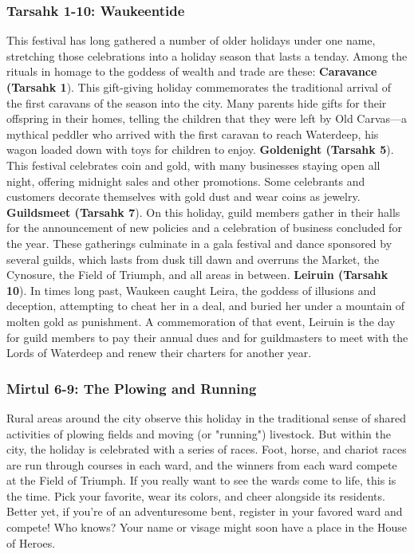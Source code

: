 \documentclass[10pt,a4paper,twoside,twocolumn,openany,nodeprecatedcode]{dndbook}
\begin{document}
\subsubsection{Tarsahk 1-10: Waukeentide}
This festival has long gathered a number of older holidays under one name, stretching those celebrations into a holiday season that lasts a tenday. Among the rituals in homage to the goddess of wealth and trade are these: \textbf{Caravance (Tarsahk 1}). This gift-giving holiday commemorates the traditional arrival of the first caravans of the season into the city. Many parents hide gifts for their offspring in their homes, telling the children that they were left by Old Carvas—a mythical peddler who arrived with the first caravan to reach Waterdeep, his wagon loaded down with toys for children to enjoy. \textbf{Goldenight (Tarsahk 5}). This festival celebrates coin and gold, with many businesses staying open all night, offering midnight sales and other promotions. Some celebrants and customers decorate themselves with gold dust and wear coins as jewelry. \textbf{Guildsmeet (Tarsahk 7}). On this holiday, guild members gather in their halls for the announcement of new policies and a celebration of business concluded for the year. These gatherings culminate in a gala festival and dance sponsored by several guilds, which lasts from dusk till dawn and overruns the Market, the Cynosure, the Field of Triumph, and all areas in between. \textbf{Leiruin (Tarsahk 10}). In times long past, Waukeen caught Leira, the goddess of illusions and deception, attempting to cheat her in a deal, and buried her under a mountain of molten gold as punishment. A commemoration of that event, Leiruin is the day for guild members to pay their annual dues and for guildmasters to meet with the Lords of Waterdeep and renew their charters for another year.
\subsubsection{Mirtul 6-9: The Plowing and Running}
Rural areas around the city observe this holiday in the traditional sense of shared activities of plowing fields and moving (or "running") livestock. But within the city, the holiday is celebrated with a series of races. Foot, horse, and chariot races are run through courses in each ward, and the winners from each ward compete at the Field of Triumph. If you really want to see the wards come to life, this is the time. Pick your favorite, wear its colors, and cheer alongside its residents. Better yet, if you're of an adventuresome bent, register in your favored ward and compete! Who knows? Your name or visage might soon have a place in the House of Heroes.
\end{document}
